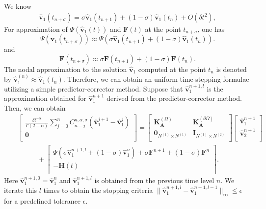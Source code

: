 \documentclass[9pt]{article}
\numberwithin{equation}{section}
\begin{document}
We know
\begin{eqnarray*}
    \widehat{\textbf{v}}_1(t_{n+\sigma})=\sigma \widehat{\textbf{v}}_1(t_{n+1})+(1-\sigma)\widehat{\textbf{v}}_1(t_{n})+O(\delta t^2),
\end{eqnarray*}
For approximation of $\Psi( \widehat{\textbf{v}}_1(t))$ and $\textbf{F}(t)$ at the point $t_{n+\sigma}$, one has 
\[\Psi( \widehat{\textbf{v}}_1(t_{n+\sigma}))\approx \Psi( \sigma\widehat{\textbf{v}}_1(t_{n+1})+(1-\sigma)\widehat{\textbf{v}}_1(t_{n})).\]
and
\[\textbf{F}(t_{n+\sigma})\approx  \sigma\textbf{F}(t_{n+1})+(1-\sigma)\textbf{F}(t_{n}).\]
 The nodal approximation to the solution $\widehat{\textbf{v}}_1$ computed at the point $t_{n}$ is denoted by $\widehat{\textbf{v}}_1^{(n)}\approx \widehat{\textbf{v}}_1(t_{n})$. Therefore, we can obtain an uniform time-stepping formulae utilizing a simple predictor-corrector method. Suppose that  $\widehat{\textbf{v}}_1^{n+1,l}$ is the approximation obtained for $\widehat{\textbf{v}}_1^{n+1}$ derived from the predictor-corrector method. Then, we can obtain
\begin{eqnarray}\label{ki1q1-aab}
&&\left[
  \begin{array}{c}
    \frac{\delta t^{-\alpha}}{\Gamma(2-\alpha)}\sum_{j=0}^{n}C_{n-j}^{n,\alpha,\sigma}(\widehat{\textbf{v}}_1^{j+1}-\widehat{\textbf{v}}_1^{j})\\
    \textbf{0}\\
  \end{array}
\right]=\left[
          \begin{array}{cc}
            \textbf{K}^{(\Omega)}_{\mathbf{A}} & \textbf{K}^{(\partial \Omega)}_{\mathbf{A}} \\
           \textbf{0}_{N^{(1)}\times N^{(1)}}&\textbf{I}_{N^{(1)}\times N^{(2)}} \\
          \end{array}
        \right]\left[
                 \begin{array}{c}
                  \widehat{\textbf{v}}_1^{n+1}\\
                   \widehat{\textbf{v}}_2^{n+1}\\
                 \end{array}
               \right]\nonumber\\
&&~~~~~~~~~~~~~+\left[
                         \begin{array}{c}
                            \Psi( \sigma\widehat{\textbf{v}}_1^{n+1,l}+(1-\sigma)\widehat{\textbf{v}}_1^{n}) +\sigma\textbf{F}^{n+1}+(1-\sigma)\textbf{F}^{n} \\
                           -\textbf{H}(t) \\
                         \end{array}
                       \right].
\end{eqnarray}
Here $\widehat{\textbf{v}}_1^{n+1,0}=\widehat{\textbf{v}}_1^{n}$ and $\widehat{\textbf{v}}_1^{n+1,l}$ is obtained from the previous time level $n$. We iterate this $l$ times to obtain the stopping criteria $\|\widehat{\textbf{v}}_1^{n+1,l}-\widehat{\textbf{v}}_1^{n+1,l-1}\|_{\infty}\leq \epsilon$ for a predefined tolerance $\epsilon$.
\end{document}
